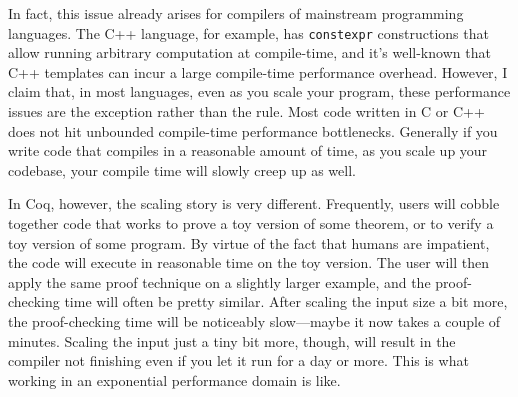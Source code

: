 In fact, this issue already arises for compilers of mainstream programming languages.
The C++ language, for example, has \texttt{constexpr} constructions that allow running arbitrary computation at compile-time, and it's well-known that C++ templates can incur a large compile-time performance overhead.
However, I claim that, in most languages, even as you scale your program, these performance issues are the exception rather than the rule.
Most code written in C or C++ does not hit unbounded compile-time performance bottlenecks.
Generally if you write code that compiles in a reasonable amount of time, as you scale up your codebase, your compile time will slowly creep up as well.


In Coq, however, the scaling story is very different.
Frequently, users will cobble together code that works to prove a toy version of some theorem, or to verify a toy version of some program.
By virtue of the fact that humans are impatient, the code will execute in reasonable time on the toy version.
The user will then apply the same proof technique on a slightly larger example, and the proof-checking time will often be pretty similar.
After scaling the input size a bit more, the proof-checking time will be noticeably slow---maybe it now takes a couple of minutes.
Scaling the input just a tiny bit more, though, will result in the compiler not finishing even if you let it run for a day or more.
This is what working in an exponential performance domain is like.

